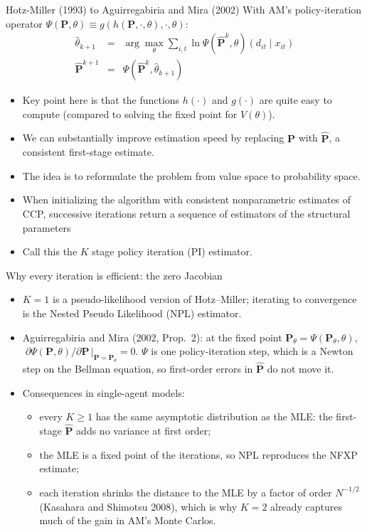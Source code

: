 \documentclass[aspectratio=169,11pt]{beamer}
\begin{document}
\begin{frame}{Hotz-Miller (1993) to Aguirregabiria and Mira (2002)}
With AM's policy-iteration operator $\Psi(\symbf{P},\theta) \equiv g(h(\symbf{P},\cdot,\theta),\cdot,\theta)$:
\begin{eqnarray*}
\hat\theta_{k+1} &=& \arg\max_\theta \sum_{i,t} \ln \Psi(\hat{\symbf{P}}^{k},\theta)(d_{it} \mid x_{it})\\
\hat{\symbf{P}}^{k+1} &=& \Psi(\hat{\symbf{P}}^{k},\hat\theta_{k+1})
\end{eqnarray*}
\vspace{-0.5cm}
\begin{itemize}
\item Key point here is that the functions $h(\cdot)$ and $g(\cdot)$ are quite easy to compute (compared to solving the fixed point for $V(\theta)$).
\item We can substantially improve estimation speed by replacing $\symbf{P}$ with $\hat{\symbf{P}}$, a consistent first-stage estimate.
\item The idea is to reformulate the problem from \alert{value space} to \alert{probability space}.
\item When initializing the algorithm with consistent nonparametric estimates of CCP, successive iterations return a sequence of estimators of the structural parameters
\item Call this the $K$ stage policy iteration (PI) estimator.
\end{itemize}
\end{frame}

\begin{frame}{Why every iteration is efficient: the zero Jacobian}
\small
\begin{itemize}
\item $K = 1$ is a pseudo-likelihood version of Hotz--Miller; iterating to convergence is the Nested Pseudo Likelihood (NPL) estimator.
\item Aguirregabiria and Mira (2002, Prop.~2): at the fixed point $\symbf P_\theta = \Psi(\symbf P_\theta, \theta)$, $\;\partial \Psi(\symbf P, \theta)/\partial \symbf P \,\big|_{\symbf P = \symbf P_\theta} = 0$.
$\Psi$ is one policy-iteration step, which is a Newton step on the Bellman equation, so first-order errors in $\hat{\symbf P}$ do not move it.
\item Consequences in single-agent models:
\begin{itemize}
\item every $K \ge 1$ has the same asymptotic distribution as the MLE: the first-stage $\hat{\symbf P}$ adds no variance at first order;
\item the MLE is a fixed point of the iterations, so NPL reproduces the NFXP estimate;
\item each iteration shrinks the distance to the MLE by a factor of order $N^{-1/2}$ (Kasahara and Shimotsu 2008), which is why $K = 2$ already captures much of the gain in AM's Monte Carlos.
\end{itemize}
\end{itemize}
\end{frame}
\end{document}
